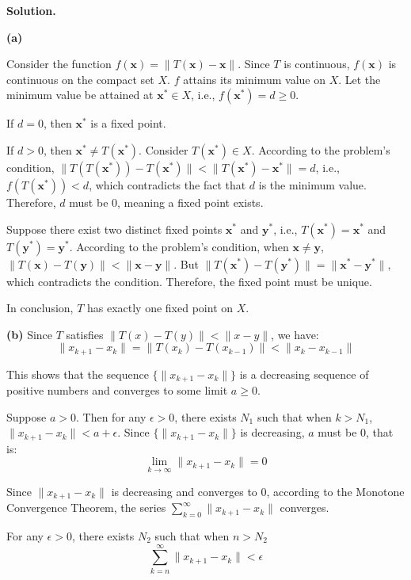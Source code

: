 \documentclass[12pt, a4paper, oneside]{ctexart}
\newenvironment{solution}{\par\noindent\textbf{Solution. }}{\par}
\begin{document}
\begin{solution}


\textbf{(a)} 

Consider the function $ f(\mathbf{x}) = \|T(\mathbf{x}) - \mathbf{x}\| $. Since $ T $ is continuous, $ f(\mathbf{x}) $ is continuous on the compact set $ X $. $ f $ attains its minimum value on $ X $. Let the minimum value be attained at $ \mathbf{x}^* \in X $, i.e., $ f(\mathbf{x}^*) = d \geq 0 $.  

If $ d = 0 $, then $ \mathbf{x}^* $ is a fixed point.  

If $ d > 0 $, then $ \mathbf{x}^* \neq T(\mathbf{x}^*) $. Consider $ T(\mathbf{x}^*) \in X $. According to the problem's condition, $ \|T(T(\mathbf{x}^*)) - T(\mathbf{x}^*)\| < \|T(\mathbf{x}^*) - \mathbf{x}^*\| = d $, i.e., $ f(T(\mathbf{x}^*)) < d $, which contradicts the fact that $ d $ is the minimum value. Therefore, $ d $ must be 0, meaning a fixed point exists.  

Suppose there exist two distinct fixed points $ \mathbf{x}^* $ and $ \mathbf{y}^* $, i.e., $ T(\mathbf{x}^*) = \mathbf{x}^* $ and $ T(\mathbf{y}^*) = \mathbf{y}^* $. According to the problem's condition, when $ \mathbf{x} \neq \mathbf{y} $, $ \|T(\mathbf{x}) - T(\mathbf{y})\| < \|\mathbf{x} - \mathbf{y}\| $. But $ \|T(\mathbf{x}^*) - T(\mathbf{y}^*)\| = \|\mathbf{x}^* - \mathbf{y}^*\| $, which contradicts the condition. Therefore, the fixed point must be unique.  

In conclusion, $ T $ has exactly one fixed point on $ X $.  

\vspace{12pt}

\textbf{(b)} 
Since $T$ satisfies $\|T(x) - T(y)\| < \|x - y\|$, we have:
$$
\|x_{k + 1} - x_k\| = \|T(x_k) - T(x_{k - 1})\| < \|x_k - x_{k - 1}\|
$$

This shows that the sequence $\{\|x_{k + 1} - x_k\|\}$ is a decreasing sequence of positive numbers and converges to some limit $a \geq 0$.

Suppose $a > 0$. Then for any $\epsilon > 0$, there exists $N_1$ such that when $k > N_1$, $\|x_{k + 1} - x_k\| < a + \epsilon$. Since $\{\|x_{k + 1} - x_k\|\}$ is decreasing, $a$ must be $0$, that is:
$$
\lim_{k \to \infty} \|x_{k + 1} - x_k\| = 0
$$

Since $\|x_{k + 1} - x_k\|$ is decreasing and converges to $0$, according to the Monotone Convergence Theorem, the series $\sum_{k = 0}^{\infty} \|x_{k + 1} - x_k\|$ converges.

For any $\epsilon > 0$, there exists $N_2$ such that when $n > N_2$
$$
\sum_{k = n}^{\infty} \|x_{k + 1} - x_k\| < \epsilon
$$


\end{solution}
\end{document}
